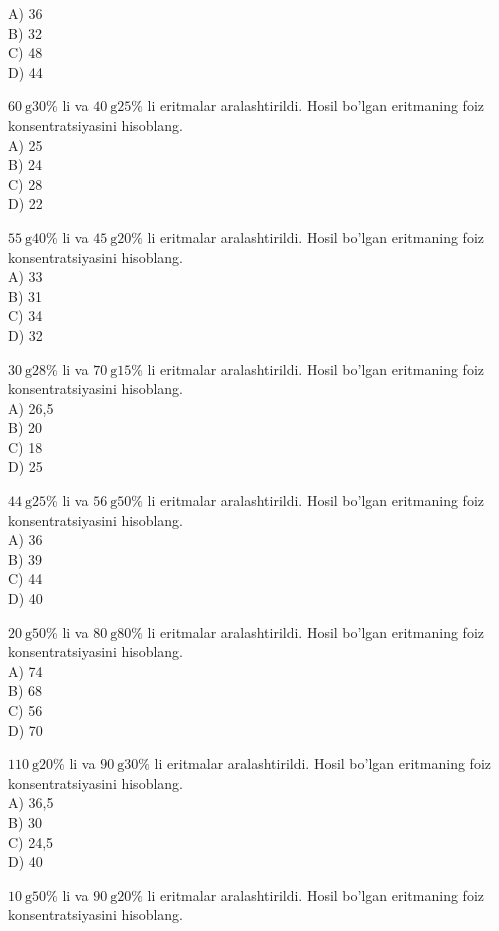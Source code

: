 A) 36\\
B) 32\\
C) 48\\
D) 44
  \item $60 \mathrm{~g} 30 \%$ li va $40 \mathrm{~g} 25 \%$ li eritmalar aralashtirildi. Hosil bo'lgan eritmaning foiz konsentratsiyasini hisoblang.\\
A) 25\\
B) 24\\
C) 28\\
D) 22
  \item $55 \mathrm{~g} 40 \%$ li va $45 \mathrm{~g} 20 \%$ li eritmalar aralashtirildi. Hosil bo'lgan eritmaning foiz konsentratsiyasini hisoblang.\\
A) 33\\
B) 31\\
C) 34\\
D) 32
  \item $30 \mathrm{~g} 28 \%$ li va $70 \mathrm{~g} 15 \%$ li eritmalar aralashtirildi. Hosil bo'lgan eritmaning foiz konsentratsiyasini hisoblang.\\
A) 26,5\\
B) 20\\
C) 18\\
D) 25
  \item $44 \mathrm{~g} 25 \%$ li va $56 \mathrm{~g} 50 \%$ li eritmalar aralashtirildi. Hosil bo'lgan eritmaning foiz konsentratsiyasini hisoblang.\\
A) 36\\
B) 39\\
C) 44\\
D) 40
  \item $20 \mathrm{~g} 50 \%$ li va $80 \mathrm{~g} 80 \%$ li eritmalar aralashtirildi. Hosil bo'lgan eritmaning foiz konsentratsiyasini hisoblang.\\
A) 74\\
B) 68\\
C) 56\\
D) 70
  \item $110 \mathrm{~g} 20 \%$ li va $90 \mathrm{~g} 30 \%$ li eritmalar aralashtirildi. Hosil bo'lgan eritmaning foiz konsentratsiyasini hisoblang.\\
A) 36,5\\
B) 30\\
C) 24,5\\
D) 40
  \item $10 \mathrm{~g} 50 \%$ li va $90 \mathrm{~g} 20 \%$ li eritmalar aralashtirildi. Hosil bo'lgan eritmaning foiz konsentratsiyasini hisoblang.\\
